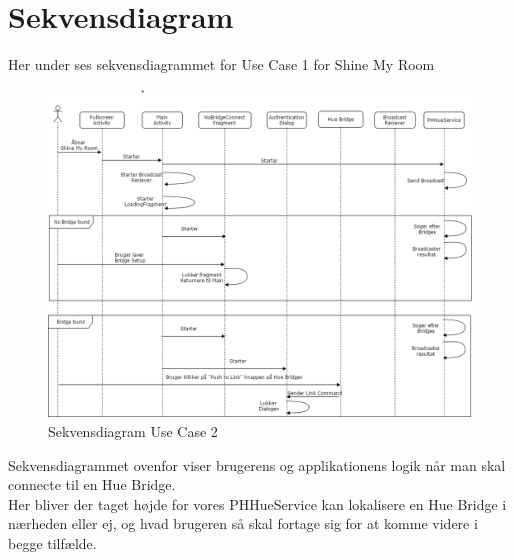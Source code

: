 \section{Sekvensdiagram}
Her under ses sekvensdiagrammet for Use Case 1 for Shine My Room
\begin{figure}[H]
	\centering
	\includegraphics[width=1\linewidth, height=0.8\linewidth]{Design/SekvensDiagramUC1}
	\caption{Sekvensdiagram Use Case 2}
	\label{fig:SekvensdiagramUC1}
\end{figure}
Sekvensdiagrammet ovenfor viser brugerens og applikationens logik når man skal connecte til en Hue Bridge. \\
Her bliver der taget højde for vores PHHueService kan lokalisere en Hue Bridge i nærheden eller ej, og hvad brugeren så skal fortage sig for at komme videre i begge tilfælde.
\newpage

